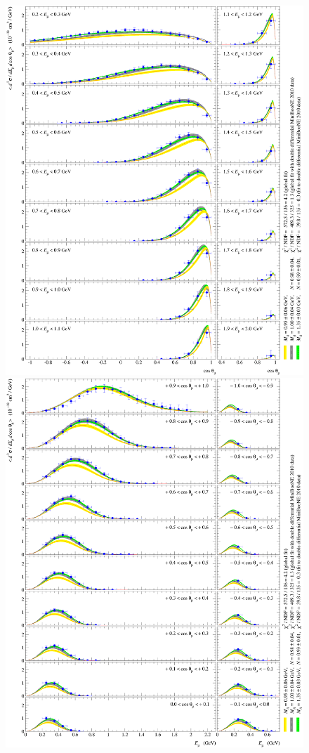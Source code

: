 \begin{figure}[htb!]
\begin{center}
\includegraphics[width=0.9\columnwidth]{./QES/d2sQESCC_dEkdcosT_Arevalo_MiniBooNE10_Ek_2_BBBA25.eps}
\includegraphics[width=0.9\columnwidth]{./QES/d2sQESCC_dEkdcosT_Arevalo_MiniBooNE10_cosT_2_BBBA25.eps}

\end{center}
\end{figure}
